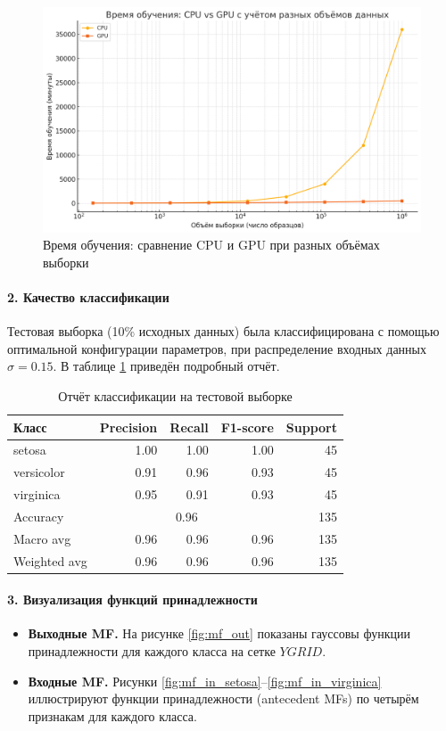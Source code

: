 \begin{figure}[ht]
  \centering
  \includegraphics[width=0.8\linewidth]{images/training_time.png}
  \caption{Время обучения: сравнение CPU и GPU при разных объёмах выборки}
  \label{fig:train_time}
\end{figure}

\paragraph{2. Качество классификации}  
Тестовая выборка (10\% исходных данных) была классифицирована с помощью оптимальной конфигурации параметров, при распределение входных данных $\sigma=0.15$. В таблице \ref{tab:class_report} приведён подробный отчёт.

\begin{table}[H]
  \centering
  \begin{tabular}{lrrrr}
    \toprule
    Класс & Precision & Recall & F1-score & Support \\
    \midrule
    setosa     & 1.00 & 1.00 & 1.00 & 45 \\
    versicolor & 0.91 & 0.96 & 0.93 & 45 \\
    virginica  & 0.95 & 0.91 & 0.93 & 45 \\
    \midrule
    Accuracy   & \multicolumn{3}{c}{0.96} & 135 \\
    Macro avg  & 0.96 & 0.96 & 0.96 & 135 \\
    Weighted avg & 0.96 & 0.96 & 0.96 & 135 \\
    \bottomrule
  \end{tabular}
  \caption{Отчёт классификации на тестовой выборке}
  \label{tab:class_report}
\end{table}

\paragraph{3. Визуализация функций принадлежности}  
\begin{itemize}
  \item \textbf{Выходные MF.} На рисунке \ref{fig:mf_out} показаны гауссовы функции принадлежности для каждого класса на сетке $YGRID$.
  \item \textbf{Входные MF.} Рисунки \ref{fig:mf_in_setosa}–\ref{fig:mf_in_virginica} иллюстрируют функции принадлежности (antecedent MFs) по четырём признакам для каждого класса.
\end{itemize}

